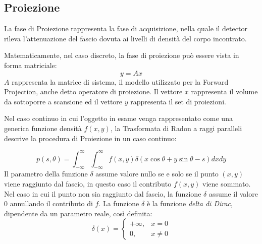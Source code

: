 \documentclass[a4paper,12pt, doubleside]{report}
\begin{document}
            \subsection{Proiezione}
                \par
                    La fase di Proiezione rappresenta la fase di acquisizione, nella quale il detector rileva l'attenuazione del fascio dovuta ai livelli di densità del corpo incontrato.
                \par
                    Matematicamente, nel caso discreto, la fase di proiezione può essere vista in forma matriciale:
                    \begin{equation}
                        y = Ax
                    \end{equation}
                    $A$ rappresenta la matrice di sistema, il modello utilizzato per la Forward Projection, anche detto operatore di proiezione. Il vettore $x$ rappresenta il volume da sottoporre a scansione ed il vettore
                    $y$ rappresenta il set di proiezioni.
                
                \bigskip
                \par
                    Nel caso continuo in cui l'oggetto in esame venga rappresentato come una generica funzione densità $f(x,y)$, la Trasformata di Radon a raggi paralleli descrive la procedura di Proiezione in un caso continuo:
                
                    \begin{equation} \label{eq:radon-fwd}
                        p(s,\theta) = \int_{-\infty}^{\infty} \int_{-\infty}^{\infty} f(x,y) \delta(x \cos \theta + y \sin \theta -s) dx dy 
                    \end{equation}
                    Il parametro della funzione $\delta$ assume valore nullo se e solo se il punto $(x,y)$ viene raggiunto dal fascio, in questo caso il contributo $f(x,y)$ viene sommato. Nel caso in cui il punto non sia raggiunto dal fascio, la funzione $\delta$ assume il valore $0$ annullando il contributo di $f$. La funzione $\delta$ è la funzione \textit{delta di Dirac}, dipendente da un parametro reale, così definita:
                    \begin{equation}
                        \delta(x) = \begin{cases} +\infty, & x = 0 \\ 0, & x \ne 0 \end{cases}
                    \end{equation}
                    
\end{document}
